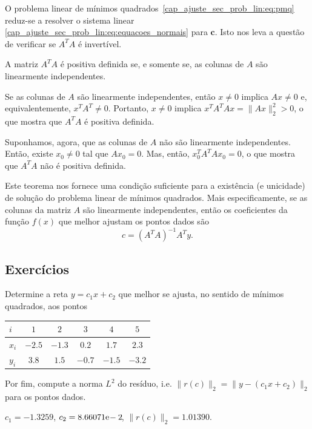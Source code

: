 O problema linear de mínimos quadrados~\eqref{cap_ajuste_sec_prob_lin:eq:pmq} reduz-se a resolver o sistema linear \eqref{cap_ajuste_sec_prob_lin:eq:equacoes_normais} para $\pmb{c}$. Isto nos leva a questão de verificar se $A^TA$ é invertível.

\begin{teo}
  A matriz $A^TA$ é positiva definida se, e somente se, as colunas de $A$ são linearmente independentes.
\end{teo}
\begin{dem}
  Se as colunas de $A$ são linearmente independentes, então $x\neq 0$ implica $Ax\neq 0$ e, equivalentemente, $x^TA^T\neq 0$. Portanto, $x\neq 0$ implica $x^TA^TAx = \|Ax\|_2^2 > 0$, o que mostra que $A^TA$ é positiva definida.

  Suponhamos, agora, que as colunas de $A$ não são linearmente independentes. Então, existe $x_0\neq 0$ tal que $Ax_0 = 0$. Mas, então, $x_0^TA^TAx_0=0$, o que mostra que $A^TA$ não é positiva definida. 
\end{dem}

Este teorema nos fornece uma condição suficiente para a existência (e unicidade) de solução do problema linear de mínimos quadrados. Mais especificamente, se as colunas da matriz $A$ são linearmente independentes, então os coeficientes da função $f(x)$ que melhor ajustam os pontos dados são
\begin{equation}
  c = (A^TA)^{-1}A^Ty.
\end{equation}

\subsection{Exercícios}

\begin{exer}
  Determine a reta $y = c_1x + c_2$ que melhor se ajusta, no sentido de mínimos quadrados, aos pontos
  \begin{center}
    \begin{tabular}{l|ccccc}
      $i$ & $1$ & $2$ & $3$ & $4$ & $5$ \\\hline
      $x_i$ & $-2.5$ & $-1.3$ & $0.2$ & $1.7$ & $2.3$\\
      $y_i$ & $3.8$ & $1.5$ & $-0.7$ & $-1.5$ & $-3.2$\\\hline
    \end{tabular}
  \end{center}
Por fim, compute a norma $L^2$ do resíduo, i.e. $\|r(c)\|_2 = \|y - (c_1x + c_2)\|_2$ para os pontos dados.
\end{exer}
\begin{resp}
  $c_1 = -1.3259$, $c_2 = 8.66071\mathrm{e}\!-2\!$, $\|r(c)\|_2 = 1.01390$.
\end{resp}

